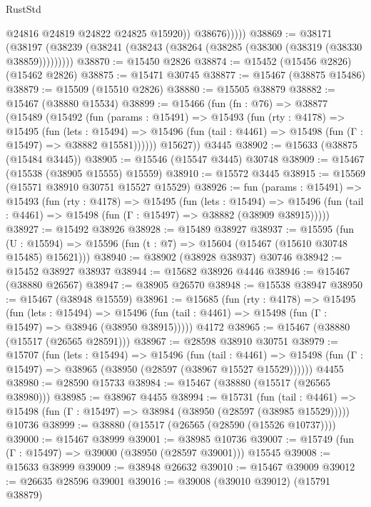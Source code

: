 \begin{lexlean}{RustStd}
\begin{coremodule}
                  @24816
                  @24819
                  @24822
                  @24825
                  @15920))
              @38676)))))
@38869 := @38171
    (@38197 (@38239 (@38241 (@38243 (@38264 (@38285 (@38300 (@38319 (@38330 @38859)))))))))
@38870 := @15450 @2826
@38874 := @15452 (@15456 @2826) (@15462 @2826)
@38875 := @15471 @30745
@38877 := @15467 (@38875 @15486)
@38879 := @15509 (@15510 @2826)
@38880 := @15505 @38879
@38882 := @15467 (@38880 @15534)
@38899 := @15466
    (fun (fn : @76) =>
    @38877
      (@15489
        (@15492
          (fun (params : @15491) =>
          @15493
            (fun (rty : @4178) =>
            @15495
              (fun (lets : @15494) =>
              @15496 (fun (tail : @4461) => @15498 (fun (Γ : @15497) => @38882 @15581))))))
        @15627))
    @3445
@38902 := @15633 (@38875 (@15484 @3445))
@38905 := @15546 (@15547 @3445) @30748
@38909 := @15467 (@15538 (@38905 @15555) @15559)
@38910 := @15572 @3445
@38915 := @15569 (@15571 @38910 @30751 @15527 @15529)
@38926 := fun (params : @15491) =>
  @15493
    (fun (rty : @4178) =>
    @15495
      (fun (lets : @15494) =>
      @15496 (fun (tail : @4461) => @15498 (fun (Γ : @15497) => @38882 (@38909 @38915)))))
@38927 := @15492 @38926
@38928 := @15489 @38927
@38937 := @15595
    (fun (U : @15594) => @15596 (fun (t : @7) => @15604 (@15467 (@15610 @30748 @15485) @15621)))
@38940 := @38902 (@38928 @38937) @30746
@38942 := @15452 @38927 @38937
@38944 := @15682 @38926 @4446
@38946 := @15467 (@38880 @26567)
@38947 := @38905 @26570
@38948 := @15538 @38947
@38950 := @15467 (@38948 @15559)
@38961 := @15685
    (fun (rty : @4178) =>
    @15495
      (fun (lets : @15494) =>
      @15496 (fun (tail : @4461) => @15498 (fun (Γ : @15497) => @38946 (@38950 @38915)))))
    @4172
@38965 := @15467 (@38880 (@15517 (@26565 @28591)))
@38967 := @28598 @38910 @30751
@38979 := @15707
    (fun (lets : @15494) =>
    @15496
      (fun (tail : @4461) =>
      @15498 (fun (Γ : @15497) => @38965 (@38950 (@28597 (@38967 @15527 @15529))))))
    @4455
@38980 := @28590 @15733
@38984 := @15467 (@38880 (@15517 (@26565 @38980)))
@38985 := @38967 @4455
@38994 := @15731
    (fun (tail : @4461) => @15498 (fun (Γ : @15497) => @38984 (@38950 (@28597 (@38985 @15529)))))
    @10736
@38999 := @38880 (@15517 (@26565 (@28590 (@15526 @10737))))
@39000 := @15467 @38999
@39001 := @38985 @10736
@39007 := @15749 (fun (Γ : @15497) => @39000 (@38950 (@28597 @39001))) @15545
@39008 := @15633 @38999
@39009 := @38948 @26632
@39010 := @15467 @39009
@39012 := @26635 @28596 @39001
@39016 := @39008 (@39010 @39012) (@15791 @38879)

\end{coremodule}
\end{lexlean}
